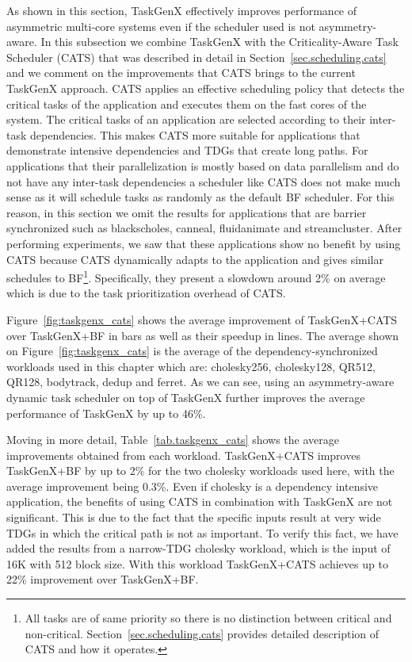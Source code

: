 As shown in this section, TaskGenX effectively improves performance of asymmetric multi-core systems even if the scheduler used is not asymmetry-aware.
In this subsection we combine TaskGenX with the Criticality-Aware Task Scheduler (CATS) that was described in detail in Section~\ref{sec.scheduling.cats} and we comment on the improvements that CATS brings to the current TaskGenX approach.
CATS applies an effective scheduling policy that detects the critical tasks of the application and executes them on the fast cores of the system.
The critical tasks of an application are selected according to their inter-task dependencies. 
This makes CATS more suitable for applications that demonstrate intensive dependencies and TDGs that create long paths.
For applications that their parallelization is mostly based on data parallelism and do not have any inter-task dependencies a scheduler like CATS does not make much sense as it will schedule tasks as randomly as the default BF scheduler.
For this reason, in this section we omit the results for applications that are barrier synchronized such as blackscholes, canneal, fluidanimate and streamcluster.
After performing experiments, we saw that these applications show no benefit by using CATS because CATS dynamically adapts to the application and gives similar schedules to BF\footnote{All tasks are of same priority so there is no distinction between critical and non-critical. Section~\ref{sec.scheduling.cats} provides detailed description of CATS and how it operates.}. 
Specifically, they present a slowdown around 2\% on average which is due to the task prioritization overhead of CATS.

Figure~\ref{fig:taskgenx_cats} shows the average improvement of TaskGenX+CATS over TaskGenX+BF in bars as well as their speedup in lines.
The average shown on Figure~\ref{fig:taskgenx_cats} is the average of the dependency-synchronized workloads used in this chapter which are: cholesky256, cholesky128, QR512, QR128, bodytrack, dedup and ferret.
As we can see, using an asymmetry-aware dynamic task scheduler on top of TaskGenX further improves the average performance of TaskGenX by up to 46\%.

Moving in more detail, Table~\ref{tab.taskgenx_cats} shows the average improvements obtained from each workload.
TaskGenX+CATS improves TaskGenX+BF by up to 2\% for the two cholesky workloads used here, with the average improvement being 0.3\%. 
Even if cholesky is a dependency intensive application, the benefits of using CATS in combination with TaskGenX are not significant.
This is due to the fact that the specific inputs result at very wide TDGs in which the critical path is not as important.
To verify this fact, we have added the results from a narrow-TDG cholesky workload, which is the input of 16K with 512 block size.
With this workload TaskGenX+CATS achieves up to 22\% improvement over TaskGenX+BF.

